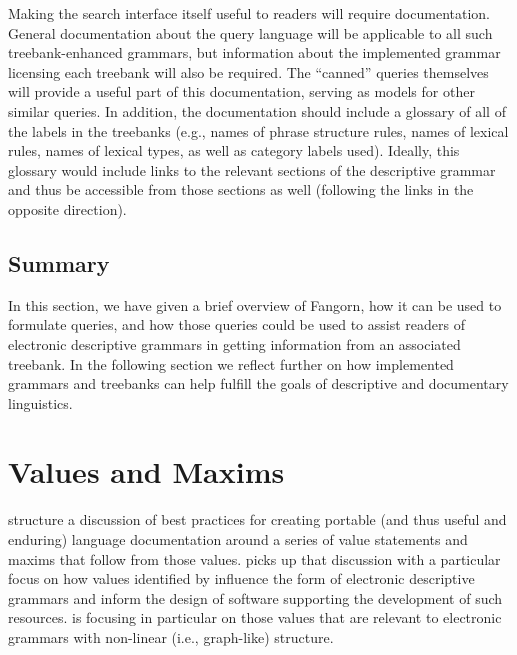 \documentclass[12pt]{article}
\begin{document}
Making the search interface itself useful to readers will require
documentation.  General documentation about the query language will be
applicable to all such treebank-enhanced grammars, but information about
the implemented grammar licensing each treebank will also be required.
The ``canned'' queries themselves will provide a useful part of this
documentation, serving as models for other similar queries.  In
addition, the documentation should include a glossary of all of the
labels in the treebanks (e.g., names of phrase structure rules, names of
lexical rules, names of lexical types, as well as category labels used).
Ideally, this glossary would include links to the relevant sections of
the descriptive grammar and thus be accessible from those sections as
well (following the links in the opposite direction).

\subsection{Summary}

In this section, we have given a brief overview of Fangorn,
how it can be used to formulate queries, and how those queries
could be used to assist readers of electronic descriptive grammars
in getting information from an associated treebank.  In the following
section we reflect further on how implemented grammars and 
treebanks can help fulfill the goals of descriptive and documentary
linguistics.

\section{Values and Maxims}
\label{sec:vm}

 structure a discussion of best practices
for creating portable (and thus useful and enduring) language
documentation around a series of value statements and maxims
that follow from those values.   picks
up that discussion with a particular focus on how values
identified by \citeauthor{Bir:Sim:03}
influence the form of electronic descriptive grammars and inform the
design of software supporting the development of such resources.
\citeauthor{Nordhoff:08} is focusing in particular on those values
that are relevant to electronic grammars with non-linear
(i.e., graph-like) structure. 
\end{document}
